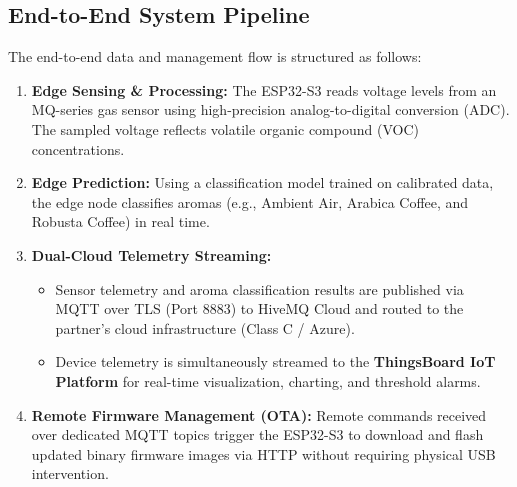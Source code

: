 ﻿\documentclass[12pt,a4paper]{article}
\begin{document}
\subsection{End-to-End System Pipeline}
The end-to-end data and management flow is structured as follows:
\begin{enumerate}
    \item \textbf{Edge Sensing \& Processing:} The ESP32-S3 reads voltage levels from an MQ-series gas sensor using high-precision analog-to-digital conversion (ADC). The sampled voltage reflects volatile organic compound (VOC) concentrations.
    \item \textbf{Edge Prediction:} Using a classification model trained on calibrated data, the edge node classifies aromas (e.g., Ambient Air, Arabica Coffee, and Robusta Coffee) in real time.
    \item \textbf{Dual-Cloud Telemetry Streaming:}
    \begin{itemize}
        \item Sensor telemetry and aroma classification results are published via MQTT over TLS (Port 8883) to HiveMQ Cloud and routed to the partner's cloud infrastructure (Class C / Azure).
        \item Device telemetry is simultaneously streamed to the \textbf{ThingsBoard IoT Platform} for real-time visualization, charting, and threshold alarms.
    \end{itemize}
    \item \textbf{Remote Firmware Management (OTA):} Remote commands received over dedicated MQTT topics trigger the ESP32-S3 to download and flash updated binary firmware images via HTTP without requiring physical USB intervention.
\end{enumerate}
\end{document}
